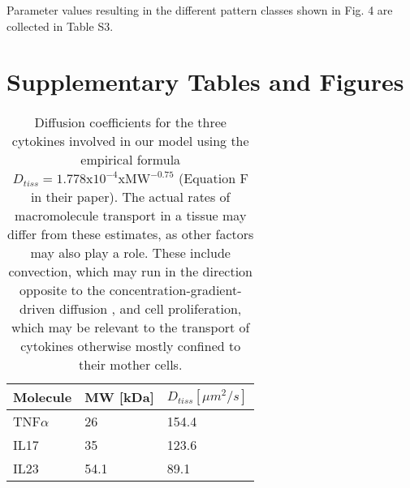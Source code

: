 Parameter values resulting in the different pattern classes shown in Fig. 4 are collected in Table S3.

\section{Supplementary Tables and Figures}

\begin{table}[h]
	\centering
	\begin{tabular}{|l|l|l|}
	\hline
	\textbf{Molecule}  & \textbf{MW [kDa]} & $D_{tiss}[\mu m^2 / s]$ \\ \hline 
	TNF$\alpha$ & 26   & 154.4 \\ \hline
	IL17        & 35   & 123.6 \\ \hline
	IL23        & 54.1 &  89.1 \\ \hline
	\end{tabular}
	\caption {Diffusion coefficients for the three cytokines involved in our model using the empirical formula $D_{tiss}=1.778\text{x}10^{-4}\text{xMW}^{-0.75}$ \citep{swabb1974}(Equation F in their paper). The actual rates of macromolecule transport in a tissue may differ from these estimates, as other factors may also play a role.  These include  convection, which may run in the direction opposite to the concentration-gradient-driven diffusion \citep{swabb1974}, and cell proliferation, which may be relevant to the transport of cytokines otherwise mostly confined to their mother cells.}
	\label{tab:S1}
\end{table}

